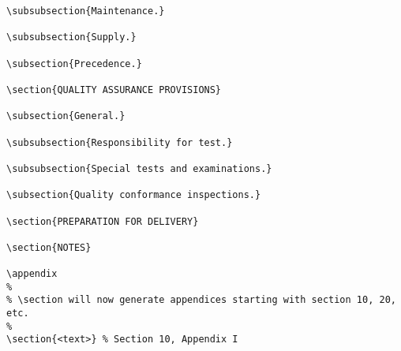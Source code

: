 \begin{itemize}
\begin{small}
\begin{verbatim}
\subsubsection{Maintenance.}

\subsubsection{Supply.}

\subsection{Precedence.}

\section{QUALITY ASSURANCE PROVISIONS}

\subsection{General.}

\subsubsection{Responsibility for test.}

\subsubsection{Special tests and examinations.}

\subsection{Quality conformance inspections.}

\section{PREPARATION FOR DELIVERY}

\section{NOTES}

\appendix
%
% \section will now generate appendices starting with section 10, 20, etc.
%
\section{<text>} % Section 10, Appendix I


\end{verbatim}
\end{small}
\end{itemize}
